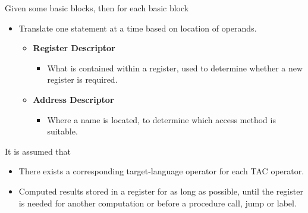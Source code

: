 \begin{definition}
    Given some basic blocks, then for each basic block
    \begin{itemize}
        \item Translate one statement at a time based on location of operands.
        \begin{itemize}
            \item \textbf{Register Descriptor}
            \begin{itemize}
                \item What is contained within a register, used to determine whether a new register is required.
            \end{itemize}
            \item \textbf{Address Descriptor}
            \begin{itemize}
                \item Where a name is located, to determine which access method is suitable.
            \end{itemize}
        \end{itemize}
    \end{itemize}
    
    It is assumed that
    \begin{itemize}
        \item There exists a corresponding target-language operator for each TAC operator.
        \item Computed results stored in a register for as long as possible, until the register is needed for another computation or before a procedure call, jump or label.
    \end{itemize}
    

\end{definition}
